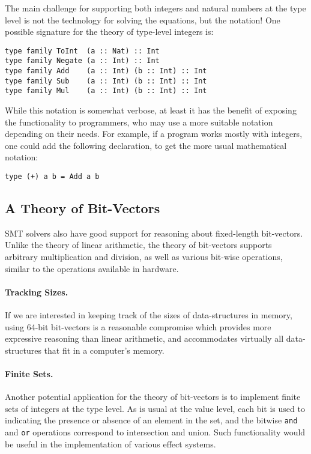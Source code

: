 \documentclass{sigplanconf}
\begin{document}
The main challenge for supporting both integers and natural numbers
at the type level is not the technology for solving the equations, but
the notation!  One possible signature for the theory of type-level
integers is:
\begin{Verbatim}
type family ToInt  (a :: Nat) :: Int
type family Negate (a :: Int) :: Int
type family Add    (a :: Int) (b :: Int) :: Int
type family Sub    (a :: Int) (b :: Int) :: Int
type family Mul    (a :: Int) (b :: Int) :: Int
\end{Verbatim}
While this notation is somewhat verbose, at least it has the benefit
of exposing the functionality to programmers, who may use a more suitable
notation depending on their needs.  For example, if a program works
mostly with integers, one could add the following declaration, to get
the more usual mathematical notation:
\begin{Verbatim}
type (+) a b = Add a b
\end{Verbatim}



\subsection{A Theory of Bit-Vectors}
SMT solvers also have good support for reasoning about fixed-length bit-vectors.
Unlike the theory of linear arithmetic, the theory of bit-vectors
supports arbitrary multiplication and division, as well as various bit-wise
operations, similar to the operations available in hardware.

\paragraph{Tracking Sizes.}
If we are interested in keeping track of the sizes of data-structures
in memory, using 64-bit bit-vectors is a reasonable compromise
which provides more expressive reasoning than linear arithmetic,
and accommodates virtually all data-structures that fit in a computer's memory.

\paragraph{Finite Sets.}
Another potential application for the theory of bit-vectors is
to implement finite sets of integers at the type level.
As is usual at the value level, each bit is used to indicating the presence
or absence of an element in the set, and the bitwise \Verb"and"
and \Verb"or" operations correspond to intersection and union.
Such functionality would be useful in the implementation of various effect
systems.
\end{document}
